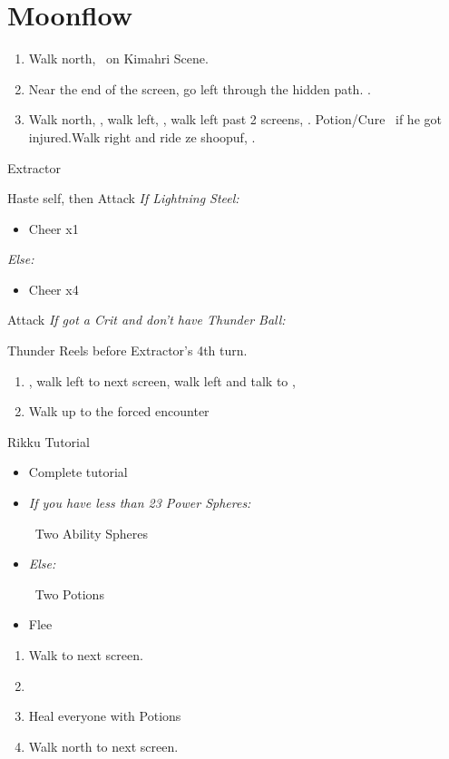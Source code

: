 \chapter{Moonflow}

\begin{enumerate}
  \item Walk north, \sd\ on Kimahri Scene.
  \item Near the end of the screen, go left through the hidden path. .
  \item Walk north, \sd, walk left, \sd, walk left past 2 screens, \sd.  Potion/Cure \tidus\ if he got injured.Walk right and ride ze shoopuf, \sd.
\end{enumerate}
\begin{battle}[4000]{Extractor}
  \begin{itemize}
    \tidusf Haste self, then \wakka
    \wakkaf Attack
    \tidusf \textit{If Lightning Steel:}
    \begin{itemize}
      \item Cheer x1
    \end{itemize}
    \textit{Else:}
    \begin{itemize}
      \item Cheer x4
    \end{itemize}
    \tidusf Attack
    \textit{If got a Crit and don't have Thunder Ball:}
    \begin{itemize}
    	\wakkaf \od Thunder Reels before Extractor's 4th turn.
	\end{itemize}
  \end{itemize}
\end{battle}
\begin{enumerate}[resume]
  \item \sd, walk left to next screen, walk left and talk to \rikku, \sd
  \item Walk up to the forced encounter
\end{enumerate}
\begin{battle}{Rikku Tutorial}
  \begin{itemize}
    \item Complete tutorial
    \item \textit{If you have less than 23 Power Spheres:}
          \begin{itemize}
            \rikkuf \od\ Two Ability Spheres
          \end{itemize}
    \item \textit{Else:}
          \begin{itemize}
            \rikkuf \od\ Two Potions
          \end{itemize}
    \item Flee
  \end{itemize}
\end{battle}
\begin{enumerate}[resume]
  \item Walk to next screen.
  \item \formation{\tidus}{\wakka}{\auron}
  \item Heal everyone with Potions
  \item Walk north to next screen.
\end{enumerate}